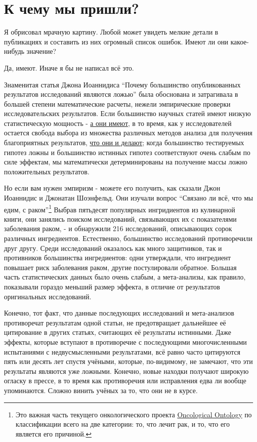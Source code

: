 \chapter{К чему мы пришли?}
\label{chp11}

Я обрисовал мрачную картину. Любой может увидеть мелкие детали в публикациях и составить из них огромный список ошибок. Имеют ли они какое-нибудь значение?

Да, имеют. Иначе я бы не написал всё это.

Знаменитая статья Джона Иоаннидиса ``Почему большинство опубликованных результатов исследований являются ложью''\cite{ioannidis_why_2005} была обоснована и затрагивала в большей степени математические расчеты, нежели эмпирические проверки исследовательских результатов. Если большинство научных статей имеют низкую статистическую мощность - \hyperref[chp3]{а они имеют}, в то время, как у исследователей остается свобода выбора из множества различных методов анализа для получения благоприятных результатов, \hyperref[chp8]{что они и делают}; когда большинство тестируемых гипотез ложны и большинство истинных гипотез соответствуют очень слабым по силе эффектам, мы математически детерминированы на получение массы ложно положительных результатов. 

Но если вам нужен эмпиризм - можете его получить, как сказали Джон Иоаннидис и Джонатан Шоэнфельд. Они изучали вопрос ``Связано ли всё, что мы едим, с раком''\cite{schoenfeld_is_2013}\footnote{Это важная часть текущего онкологического проекта \href{http://dailymailoncology.tumblr.com/}{Oncological Ontology} по классификации всего на две категории: то, что лечит рак, и то, что его является его причиной.} Выбрав пятьдесят популярных ингридиентов из кулинарной книги, они занялись поиском исследований, связывающих их с показателями заболевания раком, - и обнаружили 216 исследований, описывающих сорок различных ингредиентов. Естественно, большинство исследований противоречили друг другу. Среди исследований оказалось как много защитников, так и противников большинства ингредиентов: одни утверждали, что ингредиент повышает риск заболевания раком, другие постулировали обратное. Большая часть статистических данных было очень слабым, а мета-анализы, как правило, показывали гораздо меньший размер эффекта, в отличие от результатов оригинальных исследований.


Конечно, тот факт, что данные последующих исследований и мета-анализов противоречат результатам одной статьи, не предотвращает дальнейшее её цитирование в других статьях, считающих её результаты истинными. Даже эффекты, которые вступают в противоречие с последующими многочисленными испытаниями с недвусмысленными результатами, всё равно часто цитируются пять или десять лет спустя учёными, которые, по-видимому, не замечают, что эти результаты являются уже ложными.\cite{tatsioni_persistence_2007} Конечно, новые находки получают широкую огласку в прессе, в то время как противоречия или исправления едва ли вообще упоминаются.\cite{gonon_why_2012} Сложно винить учёных за то, что они не в курсе.

